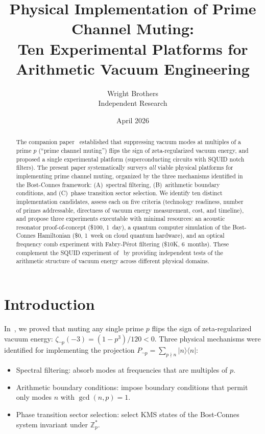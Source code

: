 \documentclass[11pt,a4paper]{article}
\begin{document}
\title{Physical Implementation of Prime Channel Muting:\\
  Ten Experimental Platforms for Arithmetic Vacuum Engineering}

\author{Wright Brothers\\{\small Independent Research}}
\date{April 2026}
\maketitle

\begin{abstract}
The companion paper~\cite{paper_A} established that suppressing
vacuum modes at multiples of a prime $p$ (``prime channel muting'')
flips the sign of zeta-regularized vacuum energy, and proposed a
single experimental platform (superconducting circuits with SQUID
notch filters). The present paper systematically surveys
\emph{all} viable physical platforms for implementing prime
channel muting, organized by the three mechanisms identified in
the Bost-Connes framework: (A)~spectral filtering,
(B)~arithmetic boundary conditions, and (C)~phase transition
sector selection. We identify ten distinct implementation
candidates, assess each on five criteria (technology readiness,
number of primes addressable, directness of vacuum energy
measurement, cost, and timeline), and propose three
experiments executable with minimal resources: an acoustic
resonator proof-of-concept (\$100, 1~day), a quantum computer
simulation of the Bost-Connes Hamiltonian (\$0, 1~week on
cloud quantum hardware), and an optical frequency comb
experiment with Fabry-P\'erot filtering (\$10K, 6~months).
These complement the SQUID experiment of~\cite{paper_A} by
providing independent tests of the arithmetic structure of
vacuum energy across different physical domains.
\end{abstract}

\section{Introduction}
\label{sec:intro}

In~\cite{paper_A}, we proved that muting any single prime $p$
flips the sign of zeta-regularized vacuum energy:
$\zeta_{\neg p}(-3) = (1-p^3)/120 < 0$.
Three physical mechanisms were identified for implementing the
projection $P_{\neg p} = \sum_{p \nmid n} |n\rangle\langle n|$:
\begin{itemize}
\item[(A)] Spectral filtering: absorb modes at frequencies
  that are multiples of $p$.
\item[(B)] Arithmetic boundary conditions: impose boundary
  conditions that permit only modes $n$ with $\gcd(n,p)=1$.
\item[(C)] Phase transition sector selection: select KMS states
  of the Bost-Connes system invariant under $\mathbb{Z}_p^*$.
\end{itemize}
\end{document}
